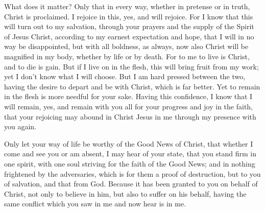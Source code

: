 {\par }{\PP {}What does it matter? Only that in every way, whether in pretense or in truth, Christ is proclaimed. I rejoice in this, yes, and will rejoice.
For I know that this will turn out to my salvation, through your prayers and the supply of the Spirit of Jesus Christ,
according to my earnest expectation and hope, that I will in no way be disappointed, but with all boldness, as always, now also Christ will be magnified in my body, whether by life or by death.
For to me to live is Christ, and to die is gain.
But if I live on in the flesh, this will bring fruit from my work; yet I don’t know what I will choose.
But I am hard pressed between the two, having the desire to depart and be with Christ, which is far better.
Yet to remain in the flesh is more needful for your sake.
Having this confidence, I know that I will remain, yes, and remain with you all for your progress and joy in the faith,
that your rejoicing may abound in Christ Jesus in me through my presence with you again.
\par }{\PP {}Only let your way of life be worthy of the Good News of Christ, that whether I come and see you or am absent, I may hear of your state, that you stand firm in one spirit, with one soul striving for the faith of the Good News;
and in nothing frightened by the adversaries, which is for them a proof of destruction, but to you of salvation, and that from God.
Because it has been granted to you on behalf of Christ, not only to believe in him, but also to suffer on his behalf,
having the same conflict which you saw in me and now hear is in me.

}
